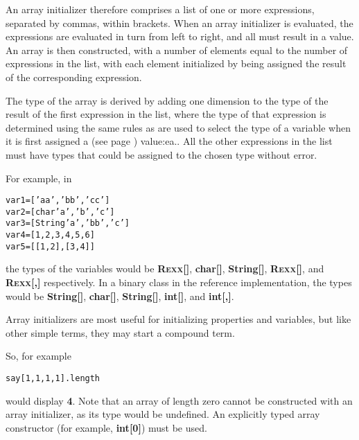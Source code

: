 An array initializer therefore comprises a list of one or more
expressions, separated by commas, within brackets.  When an array
initializer is evaluated, the expressions are evaluated in turn from
left to right, and all must result in a value.
An array is then constructed, with a number of elements
equal to the number of expressions in the list, with each element
initialized by being assigned the result of the corresponding
expression.
 
The type of the array is derived by adding one dimension to the type of
the result of the first expression in the list, where the type of that
expression is determined using the same rules as are used to select the
type of a variable when it is first  assigned a (see page \pageref{refassign}) 
value:ea..
All the other expressions in the list must have types that could be
assigned to the chosen type without error.
 
For example, in
\begin{alltt}
var1=['aa', 'bb', 'cc']
var2=[char 'a', 'b', 'c']
var3=[String 'a', 'bb', 'c']
var4=[1, 2, 3, 4, 5, 6]
var5=[[1,2], [3,4]]
\end{alltt}
the types of the variables would
be \textbf{R\textsc{exx}[]}, \textbf{char[]}, \textbf{String[]}, \textbf{R\textsc{exx}[]},
and \textbf{R\textsc{exx}[,]} respectively.
In a binary class in the reference implementation, the types would
be \textbf{String[]}, \textbf{char[]}, \textbf{String[]}, \textbf{int[]},
and \textbf{int[,]}.
 
Array initializers are most useful for initializing properties and
variables, but like other simple terms, they may start a compound term.
 
So, for example
\begin{alltt}
say [1,1,1,1].length
\end{alltt}
would display \textbf{4}.
 Note that an array of length zero cannot be constructed with an array
initializer, as its type would be undefined.  An explicitly typed array
constructor (for example, \textbf{int[0]}) must be used.
